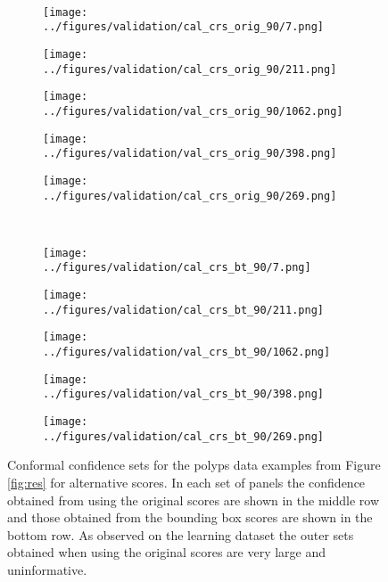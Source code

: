 \begin{figure}[h!]
\begin{subfigure}{0.19\textwidth}
		\label{fig:1}
	\end{subfigure}
	\vspace{-0.35cm}
	\\
	\begin{subfigure}{0.19\textwidth}
		\centering
		\texttt{[image: ../figures/validation/cal\_crs\_orig\_90/7.png]}
		\label{fig:1}
	\end{subfigure}
	\begin{subfigure}{0.19\textwidth}
		\centering
		\texttt{[image: ../figures/validation/cal\_crs\_orig\_90/211.png]}
		\label{fig:1}
	\end{subfigure}
	\begin{subfigure}{0.19\textwidth}
		\centering
		\texttt{[image: ../figures/validation/val\_crs\_orig\_90/1062.png]}
		\label{fig:1}
	\end{subfigure}
	\begin{subfigure}{0.19\textwidth}
		\centering
		\texttt{[image: ../figures/validation/val\_crs\_orig\_90/398.png]}
		\label{fig:1}
	\end{subfigure}
	\begin{subfigure}{0.19\textwidth}
		\centering
		\texttt{[image: ../figures/validation/cal\_crs\_orig\_90/269.png]}
		\label{fig:1}
	\end{subfigure}
	\vspace{-0.35cm}
	\\
	\begin{subfigure}{0.19\textwidth}
		\centering
		\texttt{[image: ../figures/validation/cal\_crs\_bt\_90/7.png]}
		\label{fig:1}
	\end{subfigure}
	\begin{subfigure}{0.19\textwidth}
		\centering
		\texttt{[image: ../figures/validation/cal\_crs\_bt\_90/211.png]}
		\label{fig:1}
	\end{subfigure}
	\begin{subfigure}{0.19\textwidth}
		\centering
		\texttt{[image: ../figures/validation/val\_crs\_bt\_90/1062.png]}
		\label{fig:1}
	\end{subfigure}
	\begin{subfigure}{0.19\textwidth}
		\centering
		\texttt{[image: ../figures/validation/val\_crs\_bt\_90/398.png]}
		\label{fig:1}
	\end{subfigure}
	\begin{subfigure}{0.19\textwidth}
		\centering
		\texttt{[image: ../figures/validation/cal\_crs\_bt\_90/269.png]}
		\label{fig:1}
	\end{subfigure}
	\label{fig:grid}
	\caption{Conformal confidence sets for the polyps data examples from Figure \ref{fig:res} for alternative scores. In each set of panels the confidence obtained from using the original scores are shown in the middle row and those obtained from the bounding box scores are shown in the bottom row. As observed on the learning dataset the outer sets obtained when using the original scores are very large and uninformative.}\label{fig:polpys}
\end{figure}
\newpage
